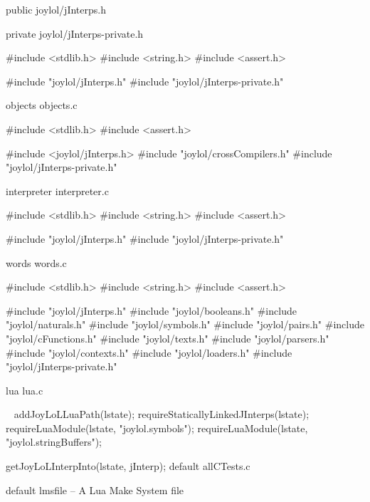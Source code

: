 \createCHeaderFile%
  {public}%
  {joylol/jInterps.h}%
  {}

\createCHeaderFile%
  {private}%
  {joylol/jInterps-private.h}%
  {}

\startCCode
#include <stdlib.h>
#include <string.h>
#include <assert.h>

#include "joylol/jInterps.h"
#include "joylol/jInterps-private.h"
\stopCCode

\createCCodeFile%
  {objects}%
  {objects.c}%
  {}

\startCCode
#include <stdlib.h>
#include <assert.h>

#include <joylol/jInterps.h>
#include "joylol/crossCompilers.h"
#include "joylol/jInterps-private.h"
\stopCCode

\createCCodeFile%
  {interpreter}%
  {interpreter.c}%
  {}

\startCCode
#include <stdlib.h>
#include <string.h>
#include <assert.h>

#include "joylol/jInterps.h"
#include "joylol/jInterps-private.h"
\stopCCode

\createCCodeFile%
  {words}%
  {words.c}%
  {}

\startCCode
#include <stdlib.h>
#include <string.h>
#include <assert.h>

#include "joylol/jInterps.h"
#include "joylol/booleans.h"
#include "joylol/naturals.h"
#include "joylol/symbols.h"
#include "joylol/pairs.h"
#include "joylol/cFunctions.h"
#include "joylol/texts.h"
#include "joylol/parsers.h"
#include "joylol/contexts.h"
#include "joylol/loaders.h"
#include "joylol/jInterps-private.h"
\stopCCode

\createCCodeFile%
  {lua}%
  {lua.c}%
  {}

\CTestsSetup\
\startCTest
  addJoyLoLLuaPath(lstate);
  requireStaticallyLinkedJInterps(lstate);
  requireLuaModule(lstate, "joylol.symbols");
  requireLuaModule(lstate, "joylol.stringBuffers");
  
  getJoyLoLInterpInto(lstate, jInterp);
\stopCTest
\createCTestFile%
  {default}%
  {allCTests.c}%
  {}





\createLmsfileFile%
  {default}%
  {lmsfile}%
  {-- A Lua Make System file}

